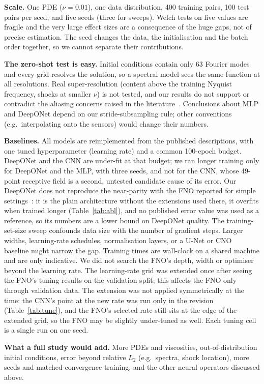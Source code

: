 \textbf{Scale.} One PDE ($\nu=0.01$), one data distribution, 400 training pairs, 100 test pairs per seed, and five seeds (three for sweeps). Welch tests on five values are fragile and the very large effect sizes are a consequence of the huge gaps, not of precise estimation. The seed changes the data, the initialisation and the batch order together, so we cannot separate their contributions.

\textbf{The zero-shot test is easy.} Initial conditions contain only 63 Fourier modes and every grid resolves the solution, so a spectral model sees the same function at all resolutions. Real super-resolution (content above the training Nyquist frequency, shocks at smaller $\nu$) is not tested, and our results do not support or contradict the aliasing concerns raised in the literature~\cite{bartolucci2023representation}. Conclusions about MLP and DeepONet depend on our stride-subsampling rule; other conventions (e.g.\ interpolating onto the sensors) would change their numbers.

\textbf{Baselines.} All models are reimplemented from the published descriptions, with one tuned hyperparameter (learning rate) and a common 100-epoch budget. DeepONet and the CNN are under-fit at that budget; we ran longer training only for DeepONet and the MLP, with three seeds, and not for the CNN, whose 49-point receptive field is a second, untested candidate cause of its error. Our DeepONet does not reproduce the near-parity with the FNO reported for simple settings~\cite{lu2021comprehensive}: it is the plain architecture without the extensions used there, it overfits when trained longer (Table~\ref{tab:abl}), and no published error value was used as a reference, so its numbers are a lower bound on DeepONet quality. The training-set-size sweep confounds data size with the number of gradient steps. Larger widths, learning-rate schedules, normalisation layers, or a U-Net or CNO~\cite{raoni2023convolutional} baseline might narrow the gap. Training times are wall-clock on a shared machine and are only indicative. We did not search the FNO's depth, width or optimiser beyond the learning rate. The learning-rate grid was extended once after seeing the FNO's tuning results on the validation split; this affects the FNO only through validation data. The extension was not applied symmetrically at the time: the CNN's point at the new rate was run only in the revision (Table~\ref{tab:tune}), and the FNO's selected rate still sits at the edge of the extended grid, so the FNO may be slightly under-tuned as well. Each tuning cell is a single run on one seed.

\textbf{What a full study would add.} More PDEs and viscosities, out-of-distribution initial conditions, error beyond relative $L_2$ (e.g.\ spectra, shock location), more seeds and matched-convergence training, and the other neural operators discussed above.
